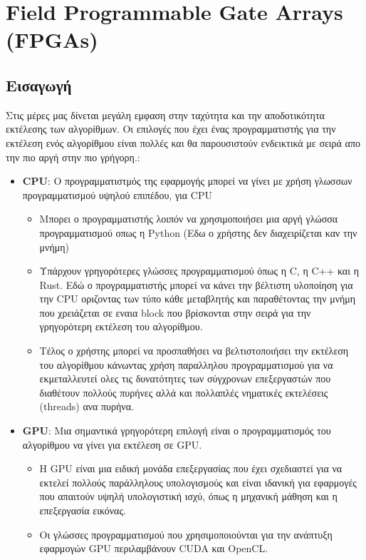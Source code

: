 \section{Field Programmable Gate Arrays (FPGAs)}
\label{sec:fpgas}

\subsection{Εισαγωγή}

Στις μέρες μας δίνεται μεγάλη εμφαση στην ταχύτητα και την αποδοτικότητα εκτέλεσης των αλγορίθμων.
Οι επιλογές που έχει ένας προγραμματιστής για την εκτέλεση ενός αλγορίθμου είναι πολλές και θα παρουσιστούν ενδεικτικά με σειρά απο την πιο αργή στην πιο γρήγορη.:
\begin{itemize}
    \item \textbf{CPU}: Ο προγραμματιστμός της εφαρμογής μπορεί να γίνει με χρήση γλωσσων προγραμματισμού υψηλού επιπέδου, για CPU
    \begin{itemize}
        \item Μπορει ο προγραμματιστής λοιπόν να χρησιμοποιήσει μια αργή γλώσσα προγραμματισμού οπως η Python (Εδω ο χρήστης δεν διαχειρίζεται καν την μνήμη)
        \item Υπάρχουν γρηγορότερες γλώσσες προγραμματισμού όπως η C, η C++ και η Rust. 
        Εδώ ο προγραμματιστής μπορεί να κάνει την βέλτιστη υλοποίηση για την CPU οριζοντας των τύπο κάθε μεταβλητής και παραθέτοντας την μνήμη που χρειάζεται σε εναια block που βρίσκονται στην σειρά
        για την γρηγορότερη εκτέλεση του αλγορίθμου.
        \item Τέλος ο χρήστης μπορεί να προσπαθήσει να βελτιστοποιήσει την εκτέλεση του αλγορίθμου κάνωντας χρήση παραλληλου προγραμματισμού για να εκμεταλλευτεί ολες 
        τις δυνατότητες των σύγχρονων επεξεργαστών που διαθέτουν πολλούς πυρήνες αλλά και πολλαπλές νηματικές εκτελέσεις (threads) ανα πυρήνα.
    \end{itemize}
    \item \textbf{GPU}: Μια σημαντικά γρηγορότερη επιλογή είναι ο προγραμματισμός του αλγορίθμου να γίνει για εκτέλεση σε GPU.
        \begin{itemize}
            \item Η GPU είναι μια ειδική μονάδα επεξεργασίας που έχει σχεδιαστεί για να εκτελεί πολλούς παράλληλους υπολογισμούς και είναι ιδανική για εφαρμογές που απαιτούν υψηλή υπολογιστική ισχύ, όπως η μηχανική μάθηση και η επεξεργασία εικόνας.
            \item Οι γλώσσες προγραμματισμού που χρησιμοποιούνται για την ανάπτυξη εφαρμογών GPU περιλαμβάνουν CUDA και OpenCL.

\end{itemize}
\end{itemize}
